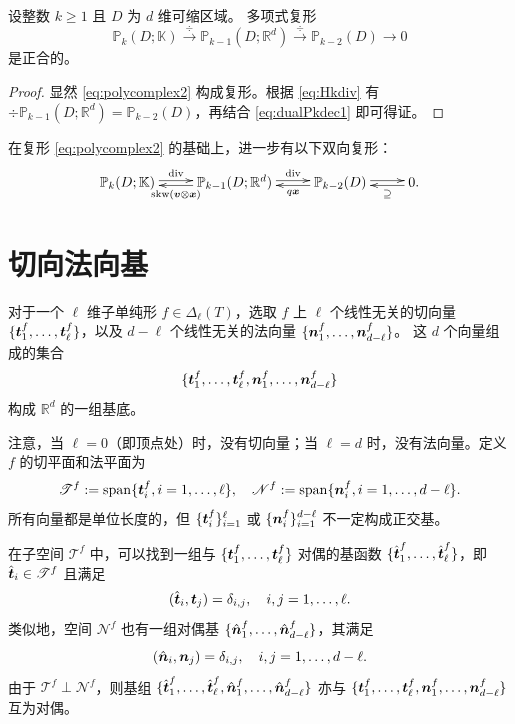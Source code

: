 \begin{lemma}
设整数 $k \geq 1$ 且 $D$ 为 $d$ 维可缩区域。 
多项式复形
\begin{equation}\label{eq:polycomplex2}
\mathbb P_k(D;\mathbb K)\xrightarrow{\div}\mathbb P_{k-1}(D;\mathbb R^d)\xrightarrow{\div}\mathbb P_{k-2}(D)\to0
\end{equation}
是正合的。
\end{lemma}
\begin{proof}
显然 \eqref{eq:polycomplex2} 构成复形。根据 \eqref{eq:Hkdiv} 有 $\div\mathbb P_{k-1}(D;\mathbb R^d)=\mathbb P_{k-2}(D)$，再结合 \eqref{eq:dualPkdec1} 即可得证。
\end{proof}

在复形 \eqref{eq:polycomplex2} 的基础上，进一步有以下双向复形：
\begin{equation*}
\xymatrix{
\mathbb P_{k}(D;\mathbb K)\ar@<0.4ex>[r]^-{\div}  & \mathbb P_{k-1}(D;\mathbb R^d)\ar@<0.4ex>[r]^-{\div}\ar@<0.4ex>[l]^-{\skw(\boldsymbol v\otimes\boldsymbol x)}  & \mathbb P_{k-2}(D) \ar@<0.4ex>[r]^-{}\ar@<0.4ex>[l]^-{ q\boldsymbol x} & 0 \ar@<0.4ex>[l]^-{ \supseteq}.
}
\end{equation*}

\section{切向法向基}


对于一个 $\ell$ 维子单纯形 $f \in \Delta_{\ell}(T)$，选取 $f$ 上 $\ell$ 个线性无关的切向量 $\{\boldsymbol t_1^f, \ldots, \boldsymbol t_{\ell}^f\}$，以及 $d-\ell$ 个线性无关的法向量 $\{\boldsymbol n_1^f, \ldots, \boldsymbol n_{d-\ell}^f\}$。
这 $d$ 个向量组成的集合
\[
\{\boldsymbol t_1^f, \ldots, \boldsymbol t_{\ell}^f, \boldsymbol n_1^f, \ldots, \boldsymbol n_{d-\ell}^f \}
\]
构成 $\mathbb{R}^d$ 的一组基底。

注意，当 $\ell=0$（即顶点处）时，没有切向量；当 $\ell=d$ 时，没有法向量。定义 $f$ 的切平面和法平面为
\[
\mathscr{T}^f := \mathrm{span} \{\boldsymbol t_i^f, i=1, \ldots, \ell \}, \quad
\mathscr{N}^f := \mathrm{span} \{\boldsymbol n_i^f, i=1, \ldots, d-\ell \}.
\]
所有向量都是单位长度的，但 $\{\boldsymbol t_i^f\}_{i=1}^{\ell}$ 或 $\{\boldsymbol n_i^f\}_{i=1}^{d-\ell}$ 不一定构成正交基。


在子空间 $\mathscr T^f$ 中，可以找到一组与 $\{\boldsymbol t_1^f, \ldots, \boldsymbol t_{\ell}^f\}$ 对偶的基函数 $\{\hat{\boldsymbol t}_1^f, \ldots, \hat{\boldsymbol t}_{\ell}^f\}$，即 $\hat{\boldsymbol t}_i \in \mathscr T^f$ 且满足
$$
(\hat{\boldsymbol t}_i, \boldsymbol t_j) = \delta_{i,j}, \quad i, j=1,\ldots,\ell.
$$
类似地，空间 $\mathscr N^f$ 也有一组对偶基 $\{\hat{\boldsymbol n}_1^f, \ldots, \hat{\boldsymbol n}_{d-\ell}^f\}$，其满足
$$
(\hat{\boldsymbol n}_i, \boldsymbol n_j) = \delta_{i,j}, \quad i, j=1,\ldots,d-\ell.
$$
由于 $\mathscr T^f \perp \mathscr N^f$，则基组 $\{\hat{\boldsymbol t}_1^f, \ldots, \hat{\boldsymbol t}_{\ell}^f, \hat{\boldsymbol n}_{1}^f, \ldots, \hat{\boldsymbol n}_{d-\ell}^f\}$ 亦与 $\{\boldsymbol t_1^f, \ldots, \boldsymbol t_{\ell}^f, \boldsymbol n_{1}^f, \ldots, \boldsymbol n_{d-\ell}^f\}$ 互为对偶。 


